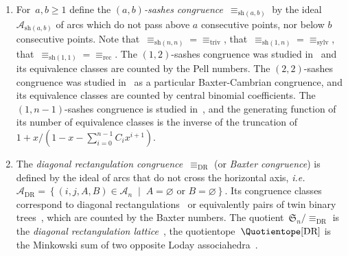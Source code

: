 \documentclass{amsart}
\theoremstyle{definition}
\newcommand{\f}[1]{{\mathfrak{#1}}} %
\newcommand{\set}[2]{\left\{ #1 \;\middle|\; #2 \right\}} %
\newcommand{\ie}{\textit{i.e.}~} %
\newcommand{\darkblue}{\color{darkblue}} %
\newcommand{\defn}[1]{\textsl{\darkblue #1}} %
\newcommand{\arcs}{{\mathcal{A}}} %
\begin{document}
\begin{enumerate}
\item \label{item:abSashesCongruence}
For~$a, b \ge 1$ define the \defn{$(a,b)$-sashes congruence}~$\equiv_{\textrm{sh}(a,b)}$ by the ideal~$\arcs_{\textrm{sh}(a,b)}$ of arcs which do not pass above $a$ consecutive points, nor below $b$ consecutive points.
Note that~${{\equiv_{\textrm{sh}(n,n)}} = {\equiv_{\textrm{triv}}}}$, that~${\equiv_{\textrm{sh}(1,n)}} = {\equiv_{\textrm{sylv}}}$, that~${\equiv_{\textrm{sh}(1,1)}} = {\equiv_{\textrm{rec}}}$.
The $(1,2)$-sashes congruence was studied in~\cite{Law} and its equivalence classes are counted by the Pell numbers.
The $(2,2)$-sashes congruence was studied in~\cite{ChatelPilaud} as a particular Baxter-Cambrian congruence, and its equivalence classes are counted by central binomial coefficients.
The~$(1,n-1)$-sashes congruence is studied in~\cite{LaniniNovelli}, and the generating function of its number of equivalence classes is the inverse of the truncation of~$1 + x/(1-x-\sum_{i=0}^{n-1} C_i x^{i+1})$.


\item \label{item:BaxterCongruence}
The \defn{diagonal rectangulation congruence}~$\equiv_\textrm{DR}$ (or \defn{Baxter congruence}) is defined by the ideal of arcs that do not cross the horizontal axis, \ie~$\arcs_\textrm{DR} = \set{(i, j, A, B) \in \arcs_n}{A = \varnothing \text{ or } B = \varnothing}$.
Its congruence classes correspond to diagonal rectangulations~\cite{LawReading} or equivalently pairs of twin binary trees~\cite{Giraudo}, which are counted by the Baxter numbers.
The quotient~$\f{S}_n / {\equiv_\textrm{DR}}$ is the \defn{diagonal rectangulation lattice}~\cite{LawReading}, the quotientope~$\Quotientope[\textrm{DR}]$ is the Minkowski sum of two opposite Loday associahedra~\cite{LawReading,CardinalPilaud}.


\end{enumerate}
\end{document}
